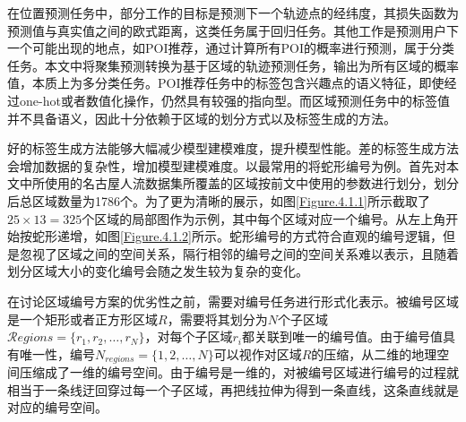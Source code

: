 \documentclass[master]{thesis-uestc}
\begin{document}
在位置预测任务中，部分工作的目标是预测下一个轨迹点的经纬度，其损失函数为预测值与真实值之间的欧式距离，这类任务属于回归任务。其他工作是预测用户下一个可能出现的地点，如POI推荐，通过计算所有POI的概率进行预测，属于分类任务。本文中将聚集预测转换为基于区域的轨迹预测任务，输出为所有区域的概率值，本质上为多分类任务。POI推荐任务中的标签包含兴趣点的语义特征，即使经过one-hot或者数值化操作，仍然具有较强的指向型。而区域预测任务中的标签值并不具备语义，因此十分依赖于区域的划分方式以及标签生成的方法。

好的标签生成方法能够大幅减少模型建模难度，提升模型性能。差的标签生成方法会增加数据的复杂性，增加模型建模难度。以最常用的将蛇形编号为例。首先对本文中所使用的名古屋人流数据集所覆盖的区域按前文中使用的参数进行划分，划分后总区域数量为1786个。为了更为清晰的展示，如图\ref{Figure.4.1.1}所示截取了$25\times 13=325$个区域的局部图作为示例，其中每个区域对应一个编号。从左上角开始按蛇形递增，如图\ref{Figure.4.1.2}所示。蛇形编号的方式符合直观的编号逻辑，但是忽视了区域之间的空间关系，隔行相邻的编号之间的空间关系难以表示，且随着划分区域大小的变化编号会随之发生较为复杂的变化。

在讨论区域编号方案的优劣性之前，需要对编号任务进行形式化表示。被编号区域是一个矩形或者正方形区域$R$，需要将其划分为$N$个子区域$\mathcal{R}egions=\{r_1,r_2,\dots,r_N\}$，对每个子区域$r_i$都关联到唯一的编号值。由于编号值具有唯一性，编号$N_{regions} = \{1,2,\dots,N\}$可以视作对区域$R$的压缩，从二维的地理空间压缩成了一维的编号空间。由于编号是一维的，对被编号区域进行编号的过程就相当于一条线迂回穿过每一个子区域，再把线拉伸为得到一条直线，这条直线就是对应的编号空间。
\end{document}

